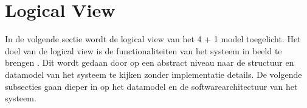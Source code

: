 \section{Logical View}
In de volgende sectie wordt de logical view van het 4 + 1 model toegelicht.
Het doel van de logical view is de functionaliteiten van het systeem in beeld te brengen \parencite{4+1ViewModelPaper}.
Dit wordt gedaan door op een abstract niveau naar de structuur en datamodel van het systeem te kijken zonder implementatie details.
De volgende subsecties gaan dieper in op het datamodel en de softwarearchitectuur van het systeem.


\newpage


